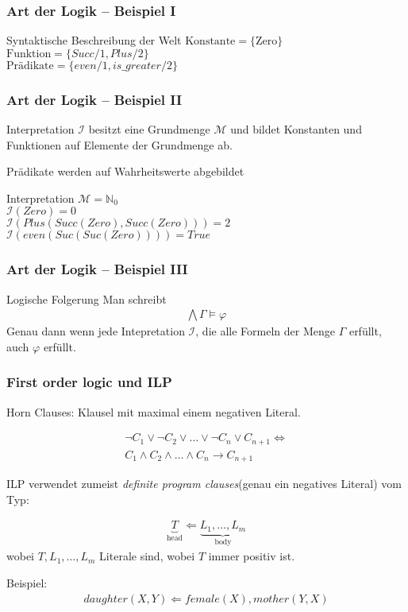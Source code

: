 \begin{frame}
	\frametitle{Art der Logik -- Beispiel I }

	\begin{block}{Syntaktische Beschreibung der Welt}
		$\text{Konstante} = \{\text{Zero}\}$\\
		$\text{Funktion} =\{Succ/1, Plus/2 \}$\\
		$\text{Prädikate} =\{even/1, is\_greater/2 \}$
	\end{block}

\end{frame}

\begin{frame}
	\frametitle{Art der Logik -- Beispiel II}
	Interpretation $\mathcal{I}$ besitzt eine Grundmenge $\mathcal{M}$
	und bildet Konstanten und Funktionen auf Elemente der Grundmenge ab.

	Prädikate werden auf Wahrheitswerte abgebildet

	\begin{block}{Interpretation}
			$\mathcal{M} = \mathbb{N}_0$\\
			$\mathcal{I}(Zero) = 0$\\
			$\mathcal{I}(Plus(Succ(Zero), Succ(Zero))) = 2$\\
			$\mathcal{I}(even(Suc(Suc(Zero)))) = True$
	\end{block}
\end{frame}

\begin{frame}
	\frametitle{Art der Logik -- Beispiel III}
	\begin{block}{Logische Folgerung}
		Man schreibt
		\begin{align*}
			 \bigwedge\Gamma \vDash \varphi
		\end{align*}
		Genau dann wenn jede Intepretation $\mathcal{I}$, die alle Formeln
		der Menge $\Gamma$ erfüllt, auch $\varphi$ erfüllt.
	\end{block}
\end{frame}

\begin{frame}
	\frametitle{First order logic und ILP}
	Horn Clauses: Klausel mit maximal einem negativen Literal.

	\begin{align*}
		\neg C_1 \vee \neg C_2 \vee \ldots \vee \neg C_n  \vee C_{n+1} \Leftrightarrow\\
		C_1 \wedge C_2 \wedge \ldots \wedge C_n  \rightarrow C_{n+1}
	\end{align*}

	ILP verwendet zumeist \textit{definite program clauses}(genau ein negatives Literal) vom Typ:

	\begin{align*}
		\underbrace{T}_{\text{head}} \Leftarrow \underbrace{L_1, \ldots, L_m}_{\text{body}}
	\end{align*}
	wobei $T, L_1, \ldots, L_m$ Literale sind, wobei $T$ immer positiv ist.

	Beispiel:
	\begin{align*}
		daughter(X,Y) \Leftarrow female(X), mother(Y, X)
	\end{align*}
\end{frame}


